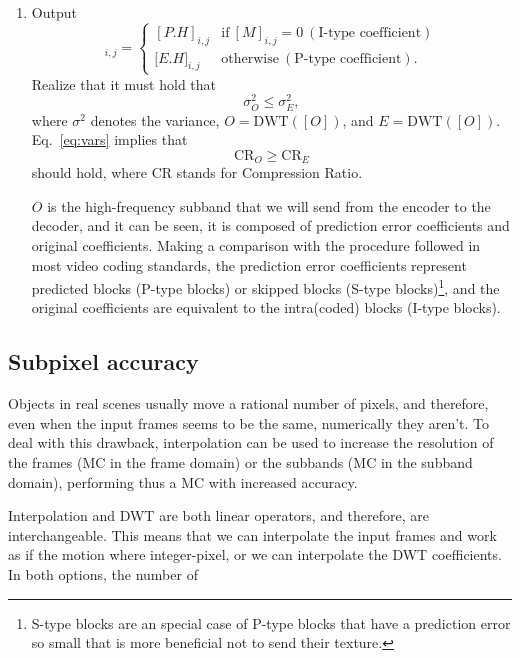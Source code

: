 \begin{enumerate}
\item Output
  \begin{equation}
    [O]_{i,j} = \left\{
      \begin{array}{ll}
        [P.H]_{i,j} & \text{if}~[M]_{i,j} = 0~(\text{I-type~coefficient})\\
        {[}E.H{]}_{i,j} & \text{otherwise}~(\text{P-type~coefficient}).
      \end{array}
    \right.
    \label{eq:output}
  \end{equation}
  Realize that it must hold that
  \begin{equation}
    \sigma^2_O \le \sigma^2_E,
    \label{eq:vars}
  \end{equation}
  where $\sigma^2$ denotes the variance, $O=\text{DWT}([O])$, and
  $E=\text{DWT}([O])$. Eq.~\ref{eq:vars} implies that
  \begin{equation}
    \text{CR}_O \ge \text{CR}_E
    \label{eq:crs}
  \end{equation}
  should hold, where CR stands for Compression Ratio.

  $O$ is the high-frequency subband that we will send from the
  encoder to the decoder, and it can be seen, it is composed of
  prediction error coefficients and original coefficients. Making a
  comparison with the procedure followed in most video coding
  standards, the prediction error coefficients represent predicted
  blocks (P-type blocks) or skipped blocks (S-type
  blocks)\footnote{S-type blocks are an special case of P-type blocks
  that have a prediction error so small that is more beneficial not to
  send their texture.}, and the original coefficients are equivalent
  to the intra(coded) blocks (I-type blocks).
\end{enumerate}


\subsection{Subpixel accuracy}
Objects in real scenes usually move a rational number of pixels, and
therefore, even when the input frames seems to be the same,
numerically they aren't. To deal with this drawback, interpolation can
be used to increase the resolution of the frames (MC in the frame
domain) or the subbands (MC in the subband domain), performing thus a
MC with increased accuracy.

Interpolation and DWT are both linear operators, and therefore, are
interchangeable. This means that we can interpolate the input frames and work as if the motion where integer-pixel, or we can interpolate the DWT coefficients. In both options, the number of 

